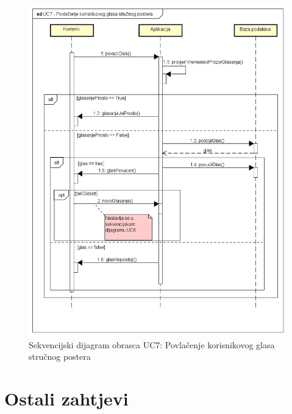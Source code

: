 				\begin{figure}[H]
					\includegraphics[width=\textwidth]{slike/uc7Sekvencijski.PNG} %
					\caption{Sekvencijski dijagram obrasca UC7: Povlačenje korisnikovog glasa stručnog postera}
					\label{fig:uc7-sekvencijski} %
				\end{figure}

		\section{Ostali zahtjevi}


